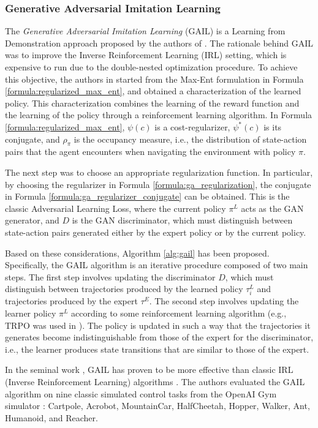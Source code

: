 \subsubsection{Generative Adversarial Imitation Learning}
\label{sec:gail}
The \textit{Generative Adversarial Imitation Learning} (GAIL) is a Learning from Demonstration approach proposed by the authors of \cite{ho2016gail}. The rationale behind GAIL was to improve the Inverse Reinforcement Learning (IRL) setting, which is expensive to run due to the double-nested optimization procedure. To achieve this objective, the authors in \cite{ho2016gail} started from the Max-Ent formulation in Formula \ref{formula:regularized_max_ent}, and obtained a characterization of the learned policy. This characterization combines the learning of the reward function and the learning of the policy through a reinforcement learning algorithm. In Formula \ref{formula:regularized_max_ent}, $\psi(c)$ is a cost-regularizer, $\psi^{*}(c)$ is its conjugate, and $\rho_{\pi}$ is the occupancy measure, i.e., the distribution of state-action pairs that the agent encounters when navigating the environment with policy $\pi$. 

The next step was to choose an appropriate regularization function. In particular, by choosing the regularizer in Formula \ref{formula:ga_regularization}, the conjugate in Formula \ref{formula:ga_regularizer_conjugate} can be obtained. This is the classic Adversarial Learning Loss, where the current policy $\pi^{L}$ acts as the GAN generator, and $D$ is the GAN discriminator, which must distinguish between state-action pairs generated either by the expert policy or by the current policy.


Based on these considerations, Algorithm \ref{alg:gail} has been proposed. Specifically, the GAIL algorithm is an iterative procedure composed of two main steps. The first step involves updating the discriminator $D$, which must distinguish between trajectories produced by the learned policy $\tau^{L}_{i}$ and trajectories produced by the expert $\tau^{E}$. The second step involves updating the learner policy $\pi^{L}$ according to some reinforcement learning algorithm (e.g., TRPO was used in \cite{ho2016gail}). The policy is updated in such a way that the trajectories it generates become indistinguishable from those of the expert for the discriminator, i.e., the learner produces state transitions that are similar to those of the expert.


In the seminal work \cite{ho2016gail}, GAIL has proven to be more effective than classic IRL (Inverse Reinforcement Learning) algorithms \cite{ziebart2008maximum_entropy,ho2016model}. The authors evaluated the GAIL algorithm on nine classic simulated control tasks from the OpenAI Gym simulator \cite{brockman2016openai}: Cartpole, Acrobot, MountainCar, HalfCheetah, Hopper, Walker, Ant, Humanoid, and Reacher.

